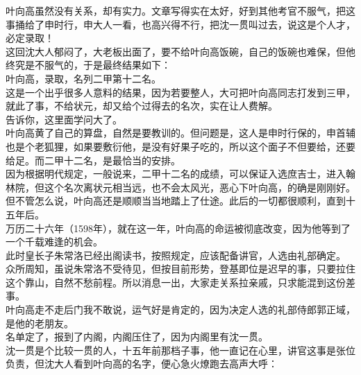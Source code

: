 \begin{multicols}{\theparacolNo}
叶向高虽然没有关系，却有实力。文章写得实在太好，好到其他考官不服气，把这事捅给了申时行，申大人一看，也高兴得不行，把沈一贯叫过去，说这是个人才，必定录取！\\

这回沈大人郁闷了，大老板出面了，要不给叶向高饭碗，自己的饭碗也难保，但他终究是不服气的，于是最终结果如下：\\

叶向高，录取，名列二甲第十二名。\\

这是一个出乎很多人意料的结果，因为若要整人，大可把叶向高同志打发到三甲，就此了事，不给状元，却又给个过得去的名次，实在让人费解。\\

告诉你，这里面学问大了。\\

叶向高黄了自己的算盘，自然是要教训的。但问题是，这人是申时行保的，申首辅也是个老狐狸，如果要敷衍他，是没有好果子吃的，所以这个面子不但要给，还要给足。而二甲十二名，是最恰当的安排。\\

因为根据明代规定，一般说来，二甲十二名的成绩，可以保证入选庶吉士，进入翰林院，但这个名次离状元相当远，也不会太风光，恶心下叶向高，的确是刚刚好。\\

但不管怎么说，叶向高还是顺顺当当地踏上了仕途。此后的一切都很顺利，直到十五年后。\\

万历二十六年（1598年），就在这一年，叶向高的命运被彻底改变，因为他等到了一个千载难逢的机会。\\

此时皇长子朱常洛已经出阁读书，按照规定，应该配备讲官，人选由礼部确定。\\

众所周知，虽说朱常洛不受待见，但按目前形势，登基即位是迟早的事，只要拉住这个靠山，自然不愁前程。所以消息一出，大家走关系拉亲戚，只求能混到这份差事。\\

叶向高走不走后门我不敢说，运气好是肯定的，因为决定人选的礼部侍郎郭正域，是他的老朋友。\\

名单定了，报到了内阁，内阁压住了，因为内阁里有沈一贯。\\

沈一贯是个比较一贯的人，十五年前那档子事，他一直记在心里，讲官这事是张位负责，但沈大人看到叶向高的名字，便心急火燎跑去高声大呼：\\


\end{multicols}
